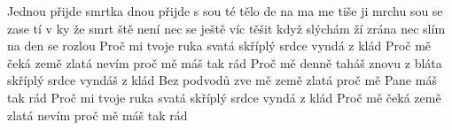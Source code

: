 \begin{TEXT}{Jednou přijde smrtka}
\SLOKA {}dnou přijde  s sou \NL
{}té tělo de na ma \NL
{}me tiše ji mrchu sou \NL
{} se zase tí v  \NL
{}ky že smrt ště není nec \NL
{} se ještě  víc těšit  \NL
{} když slýchám ží zrána nec \NL
{}slím na den  se rozlou  
\SLOKA Proč mi tvoje ruka svatá \NL
skříplý srdce vyndá z klád \NL
Proč mě čeká země zlatá \NL
nevím proč mě máš tak rád \NL
Proč mě denně taháš znovu z bláta \NL
skříplý srdce vyndáš z klád \NL
Bez podvodů zve mě země zlatá \NL
proč mě Pane máš tak rád 
\SLOKA Proč mi tvoje ruka svatá \NL
skříplý srdce vyndá z klád \NL
Proč mě čeká země zlatá \NL
nevím proč mě máš tak rád \NL
\end{TEXT}
